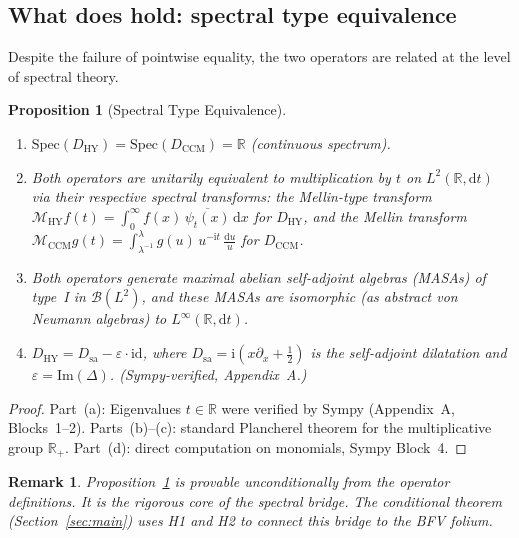 \documentclass[11pt]{article}
\newtheorem{proposition}[theorem]{Proposition}
\newtheorem{remark}[theorem]{Remark}
\newcommand{\HY}{\mathrm{HY}}
\newcommand{\CCM}{\mathrm{CCM}}
\newcommand{\Spec}{\mathrm{Spec}}
\newcommand{\dd}{\mathrm{d}}
\newcommand{\ii}{\mathrm{i}}
\newcommand{\Lam}{\lambda}
\newcommand{\eps}{\varepsilon}
\newcommand{\Del}{\Delta}
\begin{document}
\subsection{What does hold: spectral type equivalence}

Despite the failure of pointwise equality, the two operators are
related at the level of spectral theory.

\begin{proposition}[Spectral Type Equivalence]
\label{prop:spectral-type}
\begin{enumerate}
\item[(a)] $\Spec(D_\HY) = \Spec(D_\CCM) = \mathbb{R}$ (continuous spectrum).
\item[(b)] Both operators are unitarily equivalent to multiplication by
  $t$ on $L^2(\mathbb{R},\dd t)$ via their respective spectral transforms:
  the Mellin-type transform $\mathcal{M}_\HY f(t) =
  \int_0^\infty f(x)\,\overline{\psi_t(x)}\,\dd x$ for $D_\HY$, and the
  Mellin transform $\mathcal{M}_\CCM g(t) = \int_{\Lam^{-1}}^\Lam
  g(u)\,u^{-\ii t}\,\frac{\dd u}{u}$ for $D_\CCM$.
\item[(c)] Both operators generate maximal abelian self-adjoint algebras
  (MASAs) of type~I in $\mathcal{B}(L^2)$, and these MASAs are isomorphic
  (as abstract von Neumann algebras) to $L^\infty(\mathbb{R},\dd t)$.
\item[(d)] $D_\HY = D_{\mathrm{sa}} - \eps\cdot\mathrm{id}$, where
  $D_{\mathrm{sa}} = \ii(x\partial_x + \tfrac{1}{2})$ is the self-adjoint
  dilatation and $\eps = \mathrm{Im}(\Del)$. (Sympy-verified, Appendix~A.)
\end{enumerate}
\end{proposition}

\begin{proof}
Part~(a): Eigenvalues $t \in \mathbb{R}$ were verified by Sympy (Appendix~A,
Blocks~1--2). Parts~(b)--(c): standard Plancherel theorem for the multiplicative
group $\mathbb{R}_+$. Part~(d): direct computation on monomials, Sympy Block~4.
\end{proof}

\begin{remark}
Proposition~\ref{prop:spectral-type} is provable unconditionally from
the operator definitions. It is the rigorous core of the spectral
bridge. The conditional theorem (Section~\ref{sec:main}) uses H1 and H2
to connect this bridge to the BFV folium.
\end{remark}

\end{document}
